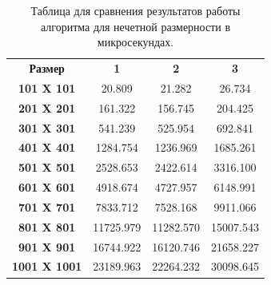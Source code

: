 \begin{table}
		\caption{Таблица для сравнения результатов работы алгоритма для нечетной размерности в микросекундах.}\label{table:noneven}
	\begin{center}
		\begin{tabular}{cccc}
            \textbf{Размер} & \textbf{1} & \textbf{2} & \textbf{3}\\
            \textbf{101 X 101} & 20.809 & 21.282 & 26.734 \\
            \textbf{201 X 201} & 161.322 & 156.745 & 204.425 \\
            \textbf{301 X 301} & 541.239 & 525.954 & 692.841 \\
            \textbf{401 X 401} & 1284.754 & 1236.969 & 1685.261 \\
            \textbf{501 X 501} & 2528.653 & 2422.614 & 3316.100 \\
            \textbf{601 X 601} & 4918.674 & 4727.957 & 6148.991 \\
            \textbf{701 X 701} & 7833.712 & 7528.168 & 9911.066 \\
            \textbf{801 X 801} & 11725.979 & 11282.570 & 15007.543 \\
            \textbf{901 X 901} & 16744.922 & 16120.746 & 21658.227 \\
            \textbf{1001 X 1001} & 23189.963 & 22264.232 & 30098.645 \\
		\end{tabular}
	\end{center}
\end{table}

\begin{figure}[ht!]
\end{figure}

